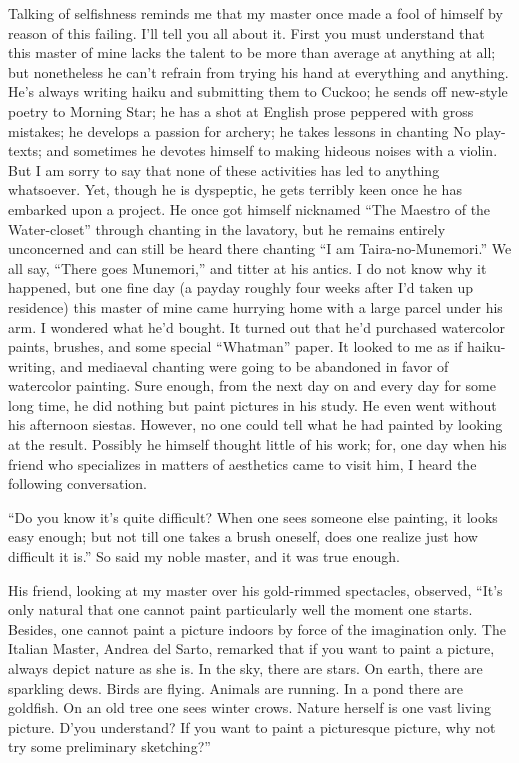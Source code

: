\documentclass{book}
\begin{document}
Talking of selfishness reminds me that my master once made a fool of
himself by reason of this failing. I'll tell you all about it. First you
must understand that this master of mine lacks the talent to be more
than average at anything at all; but nonetheless he can't refrain from
trying his hand at everything and anything. He's always writing haiku
and submitting them to Cuckoo; he sends off new-style poetry to Morning
Star; he has a shot at English prose peppered with gross mistakes; he
develops a passion for archery; he takes lessons in chanting No
play-texts; and sometimes he devotes himself to making hideous noises
with a violin. But I am sorry to say that none of these activities has
led to anything whatsoever. Yet, though he is dyspeptic, he gets
terribly keen once he has embarked upon a project. He once got himself
nicknamed ``The Maestro of the Water-closet'' through chanting in the
lavatory, but he remains entirely unconcerned and can still be heard
there chanting ``I am Taira-no-Munemori.'' We all say, ``There goes
Munemori,'' and titter at his antics. I do not know why it happened, but
one fine day (a payday roughly four weeks after I'd taken up residence)
this master of mine came hurrying home with a large parcel under his
arm. I wondered what he'd bought. It turned out that he'd purchased
watercolor paints, brushes, and some special ``Whatman'' paper. It
looked to me as if haiku-writing, and mediaeval chanting were going to
be abandoned in favor of watercolor painting. Sure enough, from the next
day on and every day for some long time, he did nothing but paint
pictures in his study. He even went without his afternoon siestas.
However, no one could tell what he had painted by looking at the result.
Possibly he himself thought little of his work; for, one day when his
friend who specializes in matters of aesthetics came to visit him, I
heard the following conversation.

``Do you know it's quite difficult? When one sees someone else painting,
it looks easy enough; but not till one takes a brush oneself, does one
realize just how difficult it is.'' So said my noble master, and it was
true enough.

His friend, looking at my master over his gold-rimmed spectacles,
observed, ``It's only natural that one cannot paint particularly well
the moment one starts. Besides, one cannot paint a picture indoors by
force of the imagination only. The Italian Master, Andrea del Sarto,
remarked that if you want to paint a picture, always depict nature as
she is. In the sky, there are stars. On earth, there are sparkling dews.
Birds are flying. Animals are running. In a pond there are goldfish. On
an old tree one sees winter crows. Nature herself is one vast living
picture. D'you understand? If you want to paint a picturesque picture,
why not try some preliminary sketching?''
\end{document}
